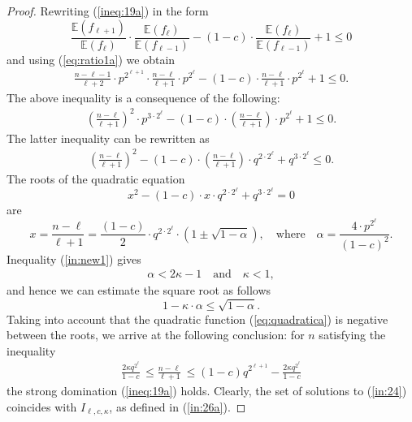 \documentclass[10pt,a4paper]{amsart}
\newcommand{\E}{\mathbb{E}}
\begin{document}
\begin{proof}
Rewriting (\ref{ineq:19a}) in the form
$$
\frac{\E(f_{\ell+1})}{\E(f_{\ell})}\cdot \frac{\E(f_{\ell})}{\E(f_{\ell-1})}-(1-c)\cdot\frac{\E(f_{\ell})}{\E(f_{\ell-1})}+1\le 0
$$
and using (\ref{eq:ratio1a}) we obtain
\begin{eqnarray*}
 \frac{n-\ell-1}{\ell+2}\cdot p^{2^{\ell+1}}\cdot \frac{n-\ell}{\ell+1}\cdot p^{2^{\ell}}- (1-c)\cdot \frac{n-\ell}{\ell+1}\cdot p^{2^{\ell}}+1\le 0.
\end{eqnarray*}
The above inequality is a consequence of the following:
\begin{eqnarray*}
 \left(\frac{n-\ell}{\ell+1}\right)^2\cdot p^{3\cdot 2^{\ell}}-(1-c)\cdot \left( \frac{n-\ell}{\ell+1}\right) \cdot p^{2^{\ell}}+1\le 0.
\end{eqnarray*}
The latter inequality can be rewritten as 
\begin{eqnarray}\label{eq:quadratica}
\left(\frac{n-\ell}{\ell+1}\right)^2 -(1-c)\cdot \left(\frac{n-\ell}{\ell+1}\right)\cdot q^{2\cdot 2^{\ell}}+  q^{3\cdot 2^\ell}\le 0. 
\end{eqnarray}
The roots of the quadratic equation $$x^2-(1-c)\cdot x\cdot q^{2\cdot 2^{\ell}} +q^{3\cdot 2^\ell}=0$$ are 
$$
x=\frac{n-\ell}{\ell+1} = \frac{(1-c)}{2}\cdot q^{2\cdot {2^\ell}}\cdot\left(1\pm \sqrt{1-\alpha}\right), \quad \mbox{where}\quad \alpha=\frac{4\cdot p^{2^\ell}}{(1-c)^2}.
$$
Inequality (\ref{in:new1}) gives 
\begin{eqnarray*}\label{eq:est}
\alpha <2\kappa-1 \quad \mbox{and}\quad \kappa <1,
\end{eqnarray*}
 and hence we can 
estimate the square root as follows
$$
1-\kappa\cdot \alpha \le \sqrt{1-\alpha}.%
$$
Taking into account that the quadratic function (\ref{eq:quadratica}) is negative between the roots, we arrive at the following conclusion: for $n$ satisfying the inequality
\begin{eqnarray}\label{in:24}
\frac{2\kappa q^{2^\ell}}{1-c} \, \le \frac{n-\ell}{\ell+1}\, \le (1-c)q^{ 2^{\ell+1}}-  \frac{2\kappa q^{2^\ell}}{1-c}
\end{eqnarray}
the strong domination (\ref{ineq:19a}) holds. Clearly, the set of solutions to (\ref{in:24}) coincides with $I_{\ell, c, \kappa}$, as defined in (\ref{in:26a}). 
\end{proof}
\end{document}
